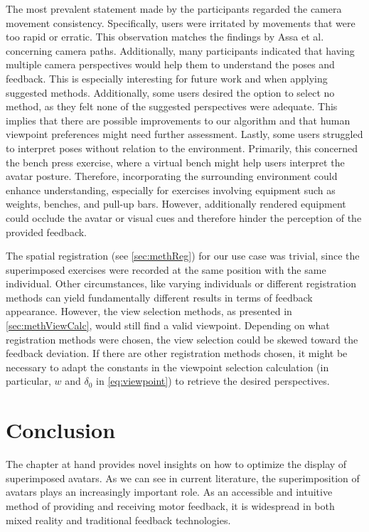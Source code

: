 The most prevalent statement made by the participants regarded the camera movement consistency. Specifically, users were irritated by movements that were too rapid or erratic. This observation matches the findings by Assa et al.~\cite{assa2008moh} concerning camera paths. Additionally, many participants indicated that having multiple camera perspectives would help them to understand the poses and feedback. This is especially interesting for future work and when applying suggested methods. Additionally, some users desired the option to select no method, as they felt none of the suggested perspectives were adequate. This implies that there are possible improvements to our algorithm and that human viewpoint preferences might need further assessment. Lastly, some users struggled to interpret poses without relation to the environment. Primarily, this concerned the bench press exercise, where a virtual bench might help users interpret the avatar posture. Therefore, incorporating the surrounding environment could enhance understanding, especially for exercises involving equipment such as weights, benches, and pull-up bars. However, additionally rendered equipment could occlude the avatar or visual cues and therefore hinder the perception of the provided feedback.

The spatial registration (see \autoref{sec:methReg}) for our use case was trivial, since the superimposed exercises were recorded at the same position with the same individual. Other circumstances, like varying individuals or different registration methods can yield fundamentally different results in terms of feedback appearance. However, the view selection methods, as presented in \autoref{sec:methViewCalc}, would still find a valid viewpoint. Depending on what registration methods were chosen, the view selection could be skewed toward the feedback deviation. If there are other registration methods chosen, it might be necessary to adapt the constants in the viewpoint selection calculation (in particular, $w$ and $\delta_0$ in \autoref{eq:viewpoint}) to retrieve the desired perspectives.

\section{Conclusion}
The chapter at hand provides novel insights on how to optimize the display of superimposed avatars. As we can see in current literature, the superimposition of avatars plays an increasingly important role. As an accessible and intuitive method of providing and receiving motor feedback, it is widespread in both mixed reality and traditional feedback technologies.

